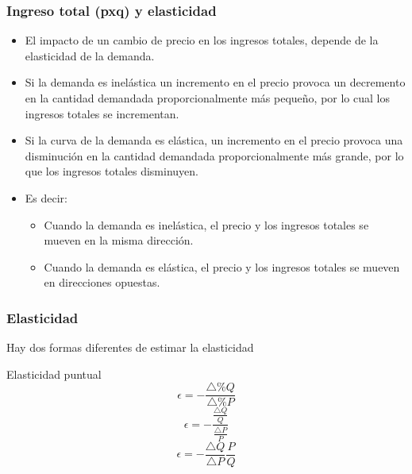 \documentclass{beamer}
\begin{document}
\begin{frame}
\frametitle{Ingreso total (pxq) y elasticidad}
\begin{itemize}
    \item El impacto de un cambio de precio en los ingresos totales, depende de la elasticidad de la demanda.
    \item Si la demanda es inelástica un incremento en el precio provoca un decremento en la cantidad demandada proporcionalmente más pequeño, por lo cual los ingresos totales se incrementan.
    \item Si la curva de la demanda es elástica, un incremento en el precio provoca una disminución en la cantidad demandada proporcionalmente más grande, por lo que los ingresos totales disminuyen.
    \item Es decir:
    \begin{itemize}
        \item Cuando la demanda es inelástica, el precio y los ingresos totales se mueven en la misma dirección.
        \item Cuando la demanda es elástica, el precio y los ingresos totales se mueven en direcciones opuestas.
    \end{itemize}
\end{itemize}
\end{frame}

\begin{frame}
\frametitle{Elasticidad}
\small Hay dos formas diferentes de estimar la elasticidad
\centering
\begin{block}{Elasticidad puntual}
\begin{equation}
\epsilon = -  \frac{\bigtriangleup \% Q}{\bigtriangleup \% P}
\end{equation}
\begin{equation}
\epsilon = - \frac{\frac{\bigtriangleup Q}{Q}}{\frac{\bigtriangleup P}{P}}
\end{equation}
\begin{equation}
\epsilon = - \frac{\bigtriangleup Q}{ \bigtriangleup P} \frac{P}{Q}
\end{equation}
\end{block}
\end{frame}
\end{document}
